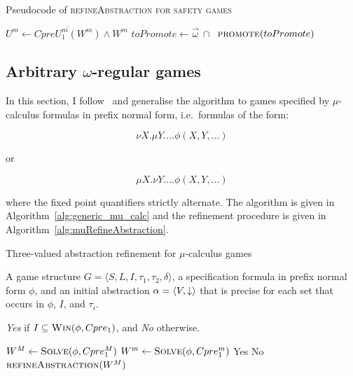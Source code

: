 \begin{algorithm}

\caption{Pseudocode of \textsc{refineAbstraction for safety games}}
\label{alg:refineAbstractionSafe}

\begin{algorithmic}[1]
\State $U^m \gets \overline{CpreU_1^{m}(W^m)} \land W^m$
    \State $toPromote \gets \vec{\omega}~\cap~$
    \State $\Call{promote}{toPromote}$
\EndFunction
\end{algorithmic}
\end{algorithm}

\subsection{Arbitrary $\omega$-regular games}
\label{sec:omega_reg}

In this section, I follow~\cite{Alfaro_Roy_07} and generalise the algorithm to games specified by $\mu$-calculus formulas in prefix normal form, i.e.\ formulas of the form:

\begin{equation}
\nu X. \mu Y. \ldots \phi(X, Y, \ldots)
\end{equation}

or

\begin{equation}
\mu X. \nu Y. \ldots \phi(X, Y, \ldots)
\end{equation}

\noindent where the fixed point quantifiers strictly alternate. The algorithm is given in Algorithm~\ref{alg:generic_mu_calc} and the refinement procedure is given in Algorithm~\ref{alg:muRefineAbstraction}.

\begin{algorithm}
\caption{Three-valued abstraction refinement for $\mu$-calculus games}
\label{alg:generic_mu_calc}

\begin{algorithmic}[1]

 A game structure $G = \langle S, L, I, \tau_1, \tau_2, \delta \rangle$, a specification formula in prefix normal form $\phi$, and an initial abstraction $\alpha=\langle V, \mathord{\downarrow} \rangle$ that is precise for each set that occurs in $\phi$, $I$, and $\tau_i$.

 {\it Yes} if $I \subseteq \textsc{Win}(\phi, Cpre_1)$, and {\it No} otherwise.

    \Loop
    \State $W^M \gets \textsc{Solve}(\phi, Cpre_1^M)$ \label{a:tvmc:sM}
    \State $W^m \gets \textsc{Solve}(\phi, Cpre_1^m)$ \label{a:tvmc:sm}
            \State\Return Yes \label{a:tvmc:Y}
            \State\Return No \label{a:tvmc:N}
        \Else       
            \State$\Call{refineAbstraction}{W^M}$
        \EndIf
    \EndLoop
\EndFunction

\end{algorithmic}
\end{algorithm}

